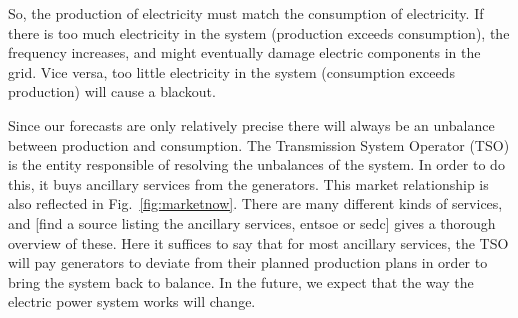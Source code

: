 So, the production of electricity must match the consumption of electricity. If there is too much electricity in the system (production exceeds consumption), the frequency increases, and might eventually damage electric components in the grid. Vice versa, too little electricity in the system (consumption exceeds production) will cause a blackout. 

Since our forecasts are only relatively precise there will always be an unbalance between production and consumption. The Transmission System Operator (TSO) is the entity responsible of resolving the unbalances of the system. In order to do this, it buys ancillary services from the generators. This market relationship is also reflected in Fig.~\ref{fig:marketnow}. There are many different kinds of services, and [find a source listing the ancillary services, entsoe or sedc] gives a thorough overview of these. Here it suffices to say that for most ancillary services, the TSO will pay generators to deviate from their planned production plans in order to bring the system back to balance. In the future, we expect that the way the electric power system works will change.
